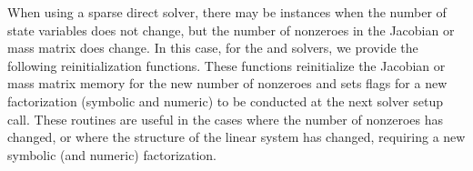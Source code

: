 \documentclass[letterpaper,10pt,english]{sphinxmanual}
\begin{document}
When using a sparse direct solver, there may be instances when the
number of state variables does not change, but the number of nonzeroes
in the Jacobian or mass matrix does change.  In this case, for the
{\hyperref[c_interface/User_callable:c.ARKKLU]{\emph{}}} and {\hyperref[c_interface/User_callable:c.ARKMassKLU]{\emph{}}} solvers, we provide the
following reinitialization functions.  These functions reinitialize
the Jacobian or mass matrix memory for the new number of nonzeroes and
sets flags for a new factorization (symbolic and numeric) to be
conducted at the next solver setup call.  These routines are useful in
the cases where the number of nonzeroes has changed, or where the
structure of the linear system has changed, requiring a new symbolic
(and numeric) factorization.
\end{document}

